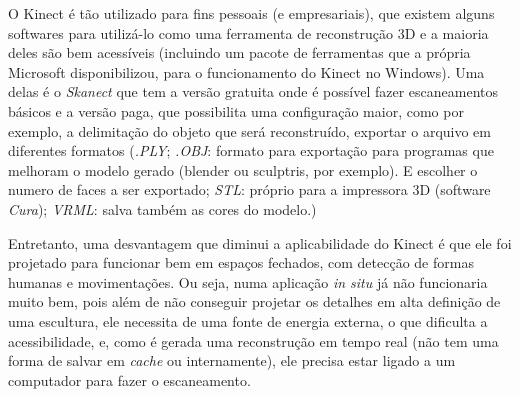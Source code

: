 O Kinect é tão utilizado para fins pessoais (e empresariais), que existem alguns softwares para utilizá-lo como uma ferramenta de reconstrução 3D e a maioria deles são bem acessíveis (incluindo um pacote de ferramentas que a própria Microsoft disponibilizou, para o funcionamento do Kinect no Windows). Uma delas é o \emph{Skanect} que tem a versão gratuita onde é possível fazer escaneamentos básicos e a versão paga, que possibilita uma configuração maior, como por exemplo, a delimitação do objeto que será reconstruído, exportar o arquivo em diferentes formatos (\emph{.PLY}; \emph{.OBJ}: formato para exportação para programas que melhoram o modelo gerado (blender ou sculptris, por exemplo). E escolher o numero de faces a ser exportado; \emph{STL}: próprio para a impressora 3D (software \emph{Cura}); \emph{VRML}: salva também as cores do modelo.)

Entretanto, uma desvantagem que diminui a aplicabilidade do Kinect é que ele foi projetado para funcionar bem em espaços fechados, com detecção de formas humanas e movimentações. Ou seja, numa aplicação \emph{in situ} já não funcionaria muito bem, pois além de não conseguir projetar os detalhes em alta definição de uma escultura, ele necessita de uma fonte de energia externa, o que dificulta a acessibilidade, e, como  é gerada uma reconstrução em tempo real (não tem uma forma de salvar em \emph{cache} ou internamente), ele precisa estar ligado a um computador para fazer o escaneamento.